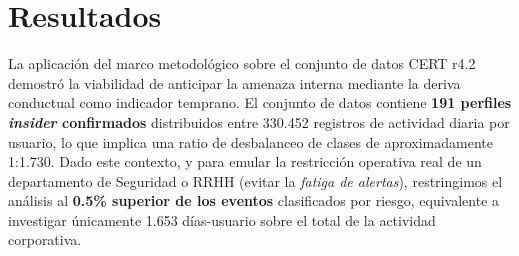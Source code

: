\documentclass[IB]{TFUOC}%
\begin{document}
\chapter{Resultados}

La aplicación del marco metodológico sobre el conjunto de datos CERT r4.2 demostró la viabilidad de anticipar la amenaza interna mediante la deriva conductual como indicador temprano. El conjunto de datos contiene \textbf{191 perfiles \textit{insider} confirmados} distribuidos entre 330.452 registros de actividad diaria por usuario, lo que implica una ratio de desbalanceo de clases de aproximadamente 1:1.730. Dado este contexto, y para emular la restricción operativa real de un departamento de Seguridad o RRHH (evitar la \textit{fatiga de alertas}), restringimos el análisis al \textbf{0.5\% superior de los eventos} clasificados por riesgo, equivalente a investigar únicamente 1.653 días-usuario sobre el total de la actividad corporativa.
\end{document}
